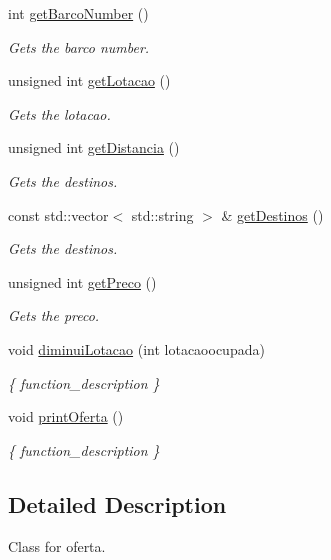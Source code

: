 \begin{DoxyCompactItemize}
int \hyperlink{classOferta_abf0f062fa730edf6d4232926980b106c}{get\+Barco\+Number} ()
\begin{DoxyCompactList}\small\item\em Gets the barco number. \end{DoxyCompactList}\item 
unsigned int \hyperlink{classOferta_a9c8fbec401e54e590828209931bf25b0}{get\+Lotacao} ()
\begin{DoxyCompactList}\small\item\em Gets the lotacao. \end{DoxyCompactList}\item 
unsigned int \hyperlink{classOferta_a0d07f80f25f4fb21c0819c3e25d67fb9}{get\+Distancia} ()
\begin{DoxyCompactList}\small\item\em Gets the destinos. \end{DoxyCompactList}\item 
const std\+::vector$<$ std\+::string $>$ \& \hyperlink{classOferta_a746c91e5db19098d211a3f6bde2ec8ec}{get\+Destinos} ()
\begin{DoxyCompactList}\small\item\em Gets the destinos. \end{DoxyCompactList}\item 
unsigned int \hyperlink{classOferta_a6237afc2e8a33fb55b1ef0decf9d9aaa}{get\+Preco} ()
\begin{DoxyCompactList}\small\item\em Gets the preco. \end{DoxyCompactList}\item 
void \hyperlink{classOferta_a15e6c1e4f49243136eb5ca1d46925a77}{diminui\+Lotacao} (int lotacaoocupada)
\begin{DoxyCompactList}\small\item\em \{ function\+\_\+description \} \end{DoxyCompactList}\item 
\mbox{\label{classOferta_a745e9845f3d1a36e8a8712d576f303ba}} 
void \hyperlink{classOferta_a745e9845f3d1a36e8a8712d576f303ba}{print\+Oferta} ()
\begin{DoxyCompactList}\small\item\em \{ function\+\_\+description \} \end{DoxyCompactList}\end{DoxyCompactItemize}


\subsection{Detailed Description}
Class for oferta. 

